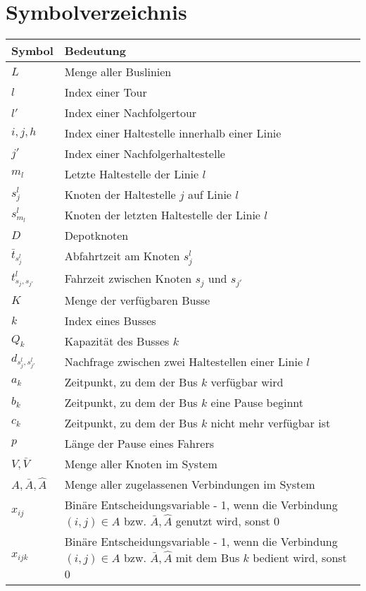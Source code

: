 \chapter*{Symbolverzeichnis}

\begin{longtable}[l]{@{}>{\centering\arraybackslash}p{5cm}p{11cm}@{}}
    \textbf{Symbol} & \textbf{Bedeutung} \\
    \midrule
    $L$ & Menge aller Buslinien \\
    $l$ & Index einer Tour \\ 
    $l'$ & Index einer Nachfolgertour \\

    $i, j, h$ & Index einer Haltestelle innerhalb einer Linie \\
    $j'$ & Index einer Nachfolgerhaltestelle\\
    $m_l$ & Letzte Haltestelle der Linie $l$ \\
    $s_j^l$ & Knoten der Haltestelle $j$ auf Linie $l$ \\
    $s_{m_l}^l$ & Knoten der letzten Haltestelle der Linie $l$ \\
    $D$ & Depotknoten \\

    $\bar{t}_{s_j^l}$ & Abfahrtzeit am Knoten $s_j^l$ \\
    $t_{s_j,s_{j'}}^l$ & Fahrzeit zwischen Knoten $s_j$ und $s_{j'}$ \\

    $K$ & Menge der verfügbaren Busse \\
    $k$ & Index eines Busses \\
    $Q_k$ & Kapazität des Busses $k$ \\
    $d_{s_j^l,s_{j'}^l}$ & Nachfrage zwischen zwei Haltestellen einer Linie $l$ \\
    $a_k$ & Zeitpunkt, zu dem der Bus $k$ verfügbar wird \\
    $b_k$ & Zeitpunkt, zu dem der Bus $k$ eine Pause beginnt \\
    $c_k$ & Zeitpunkt, zu dem der Bus $k$ nicht mehr verfügbar ist \\
    $p$ & Länge der Pause eines Fahrers \\

    $V, \bar{V}$ & Menge aller Knoten im System \\
    $A, \bar{A}, \hat{A}$ & Menge aller zugelassenen Verbindungen im System \\
    
    $x_{ij}$ & Binäre Entscheidungsvariable - 1, wenn die Verbindung $(i,j) \in A$ bzw. $\bar{A},\hat{A}$ genutzt wird, sonst 0\\
    $x_{ijk}$ & Binäre Entscheidungsvariable - 1, wenn die Verbindung $(i,j) \in A$ bzw. $\bar{A},\hat{A}$ mit dem Bus $k$ bedient wird, sonst 0\\
    

\end{longtable}
